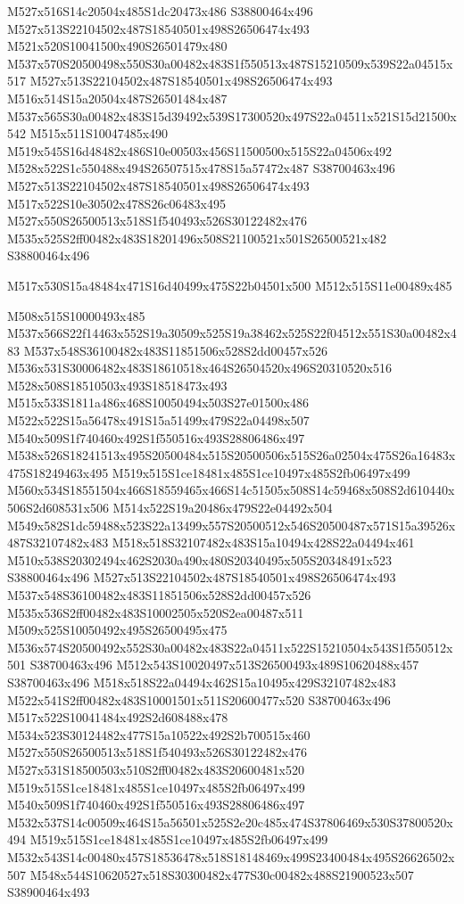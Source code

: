 \documentclass{article}
\begin{document}
\begin{multicols}{2}
M527x516S14c20504x485S1dc20473x486 S38800464x496 M527x513S22104502x487S18540501x498S26506474x493 M521x520S10041500x490S26501479x480 M537x570S20500498x550S30a00482x483S1f550513x487S15210509x539S22a04515x517 M527x513S22104502x487S18540501x498S26506474x493 M516x514S15a20504x487S26501484x487 M537x565S30a00482x483S15d39492x539S17300520x497S22a04511x521S15d21500x542 M515x511S10047485x490 M519x545S16d48482x486S10e00503x456S11500500x515S22a04506x492 M528x522S1c550488x494S26507515x478S15a57472x487 S38700463x496 M527x513S22104502x487S18540501x498S26506474x493 M517x522S10e30502x478S26c06483x495 M527x550S26500513x518S1f540493x526S30122482x476 M535x525S2ff00482x483S18201496x508S21100521x501S26500521x482 S38800464x496

\begin{center}
M517x530S15a48484x471S16d40499x475S22b04501x500 M512x515S11e00489x485 
\end{center}


M508x515S10000493x485 M537x566S22f14463x552S19a30509x525S19a38462x525S22f04512x551S30a00482x483 M537x548S36100482x483S11851506x528S2dd00457x526 M536x531S30006482x483S18610518x464S26504520x496S20310520x516 M528x508S18510503x493S18518473x493 M515x533S1811a486x468S10050494x503S27e01500x486 M522x522S15a56478x491S15a51499x479S22a04498x507 M540x509S1f740460x492S1f550516x493S28806486x497 M538x526S18241513x495S20500484x515S20500506x515S26a02504x475S26a16483x475S18249463x495 M519x515S1ce18481x485S1ce10497x485S2fb06497x499 M560x534S18551504x466S18559465x466S14c51505x508S14c59468x508S2d610440x506S2d608531x506 M514x522S19a20486x479S22e04492x504 M549x582S1dc59488x523S22a13499x557S20500512x546S20500487x571S15a39526x487S32107482x483 M518x518S32107482x483S15a10494x428S22a04494x461 M510x538S20302494x462S2030a490x480S20340495x505S20348491x523 S38800464x496 M527x513S22104502x487S18540501x498S26506474x493 M537x548S36100482x483S11851506x528S2dd00457x526 M535x536S2ff00482x483S10002505x520S2ea00487x511 M509x525S10050492x495S26500495x475 M536x574S20500492x552S30a00482x483S22a04511x522S15210504x543S1f550512x501 S38700463x496 M512x543S10020497x513S26500493x489S10620488x457 S38700463x496 M518x518S22a04494x462S15a10495x429S32107482x483 M522x541S2ff00482x483S10001501x511S20600477x520 S38700463x496 M517x522S10041484x492S2d608488x478 M534x523S30124482x477S15a10522x492S2b700515x460 M527x550S26500513x518S1f540493x526S30122482x476 M527x531S18500503x510S2ff00482x483S20600481x520 M519x515S1ce18481x485S1ce10497x485S2fb06497x499 M540x509S1f740460x492S1f550516x493S28806486x497 M532x537S14c00509x464S15a56501x525S2e20c485x474S37806469x530S37800520x494 M519x515S1ce18481x485S1ce10497x485S2fb06497x499 M532x543S14c00480x457S18536478x518S18148469x499S23400484x495S26626502x507 M548x544S10620527x518S30300482x477S30c00482x488S21900523x507 S38900464x493


\end{multicols}
\end{document}
